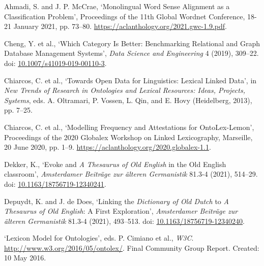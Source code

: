 \begin{list}{}%
{\leftmargin=0.5in \itemindent=-0.5in}
\setlength{\itemsep}{0pt}
\setlength{\parskip}{0pt}
\setlength{\parsep}{0pt}

\item %
Ahmadi, S. and J. P. McCrae, `Monolingual Word Sense Alignment as a Classification Problem', Proceedings of the 11th Global Wordnet Conference, 18-21 January 2021, pp. 73–80. \url{https://aclanthology.org/2021.gwc-1.9.pdf}.

\item %
Cheng, Y. et al., `Which Category Is Better: Benchmarking Relational and Graph Database Management Systems', \textit{Data Science and Engineering} 4 (2019), 309–22. doi: \href{https://doi.org/10.1007/s41019-019-00110-3}{\url{10.1007/s41019-019-00110-3}}.

\item %
Chiarcos, C. et al., `Towards Open Data for Linguistics: Lexical Linked Data', in \textit{New Trends of Research in Ontologies and Lexical Resources: Ideas, Projects, Systems}, eds. A. Oltramari, P. Vossen, L. Qin, and E. Hovy (Heidelberg, 2013), pp. 7–25.

\item %
Chiarcos, C. et al., `Modelling Frequency and Attestations for OntoLex-Lemon', Proceedings of the 2020 Globalex Workshop on Linked Lexicography, Marseille, 20 June 2020, pp. 1–9. \url{https://aclanthology.org/2020.globalex-1.1}.

\item %
Dekker, K., `Evoke and \textit{A Thesaurus of Old English} in the Old English classroom', \textit{Amsterdamer Beiträge zur älteren Germanistik} 81.3-4 (2021), 514–29. doi: \href{https://doi.org/10.1163/18756719-12340241}{\url{10.1163/18756719-12340241}}.

\item %
Depuydt, K. and J. de Does, `Linking the \textit{Dictionary of Old Dutch} to \textit{A Thesaurus of Old English}: A First Exploration', \textit{Amsterdamer Beiträge zur älteren Germanistik} 81.3-4 (2021), 493–513. doi: \href{https://doi.org/10.1163/18756719-12340240}{\url{10.1163/18756719-12340240}}.

\item %
`Lexicon Model for Ontologies', eds. P. Cimiano et al., \textit{W3C}. \url{http://www.w3.org/2016/05/ontolex/}. Final Community Group Report. Created: 10 May 2016.


\end{list}
